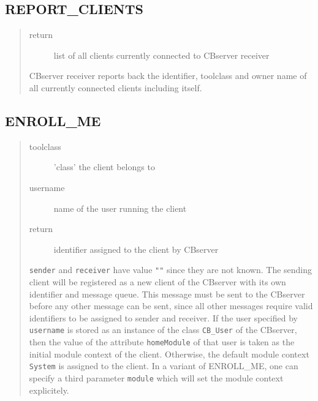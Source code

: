 \subsection{REPORT\_CLIENTS}


\begin{quote}
\begin{description}
\item[return] list of all clients currently connected to CBserver receiver
\end{description}

CBserver receiver reports back the identifier, toolclass and owner
name of all currently connected clients including itself.
\end{quote}


\subsection{ENROLL\_ME}


\begin{quote}
\begin{description}
\item[toolclass] 'class' the client belongs to
\item[username] name of the user running the client
\item[return] identifier assigned to the client by CBserver
\end{description}

{\tt sender} and {\tt receiver} have value \verb+""+ since they are not known. The
sending client will be registered as a new client of the CBserver with
its own identifier and message queue. This message must be sent to the
CBserver before any other message can be sent, since all other
messages require valid identifiers to be assigned to sender and
receiver.
If the user specified by {\tt username} is stored as an instance of
the class {\tt CB\_User} of the CBserver, then the value of the attribute
{\tt homeModule} of that user is taken as the initial module context
of the client. Otherwise, the default module context {\tt System} is
assigned to the client.
In a variant of ENROLL\_ME, one can specify a third parameter {\tt module}
which will set the module context explicitely.

\end{quote}


